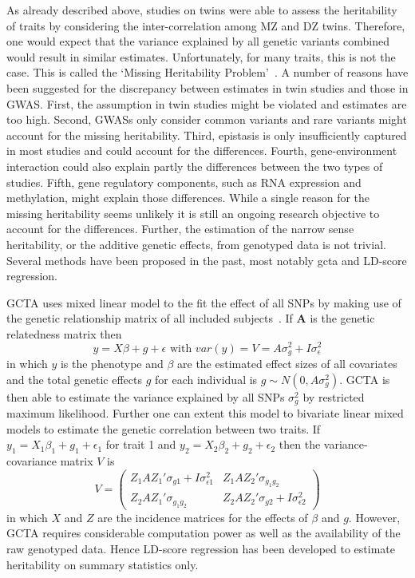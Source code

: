 As already described above, studies on twins were able to assess the heritability of traits by considering the inter-correlation among MZ and DZ twins.
Therefore, one would expect that the variance explained by all genetic variants combined would result in similar estimates.
Unfortunately, for many traits, this is not the case.
This is called the `Missing Heritability Problem'~\cite{Vineis2010}.
A number of reasons have been suggested for the discrepancy between estimates in twin studies and those in GWAS\@.
First, the assumption in twin studies might be violated and estimates are too high.
Second, GWASs only consider common variants and rare variants might account for the missing heritability.
Third, epistasis is only insufficiently captured in most studies and could account for the differences.
Fourth, gene-environment interaction could also explain partly the differences between the two types of studies.
Fifth, gene regulatory components, such as RNA expression and methylation, might explain those differences.
While a single reason for the missing heritability seems unlikely it is still an ongoing research objective to account for the differences.
Further, the estimation of the narrow sense heritability, or the additive genetic effects, from genotyped data is not trivial.
Several methods have been proposed in the past, most notably \acrfull{gcta} and LD-score regression.

GCTA uses mixed linear model to the fit the effect of all SNPs by making use of the genetic relationship matrix of all included subjects~\cite{Yang2011}.
If $\textbf{A}$ is the genetic relatedness matrix then
\begin{equation}
  y = X\beta + g + \epsilon \text{ with } var(y) = V = A\sigma^2_g + I\sigma^2_\epsilon
\end{equation}
in which $y$ is the phenotype and $\beta$ are the estimated effect sizes of all covariates and the total genetic effects $g$ for each individual is $g \sim N(0, A\sigma^2_g)$.
GCTA is then able to estimate the variance explained by all SNPs $\sigma^2_g$ by restricted maximum likelihood.
Further one can extent this model to bivariate linear mixed models to estimate the genetic correlation between two traits.
If $y_1 = X_1\beta_1 + g_1 + \epsilon_1$ for trait 1 and $y_2= X_2\beta_2 + g_2 + \epsilon_2$ then the variance-covariance matrix $V$ is
\begin{equation}
  V = 
  \begin{pmatrix}
    Z_1AZ_1'\sigma_{g1} + I\sigma^2_{\epsilon 1} & Z_1AZ_2'\sigma_{g_1g_2} \\
    Z_2AZ_1'\sigma_{g_1g_2} & Z_2AZ_2'\sigma_{g2} + I\sigma^2_{\epsilon 2}
  \end{pmatrix}
\end{equation}
in which $X$ and $Z$ are the incidence matrices for the effects of $\beta$ and $g$.
However, GCTA requires considerable computation power as well as the availability of the raw genotyped data.
Hence LD-score regression has been developed to estimate heritability on summary statistics only.

